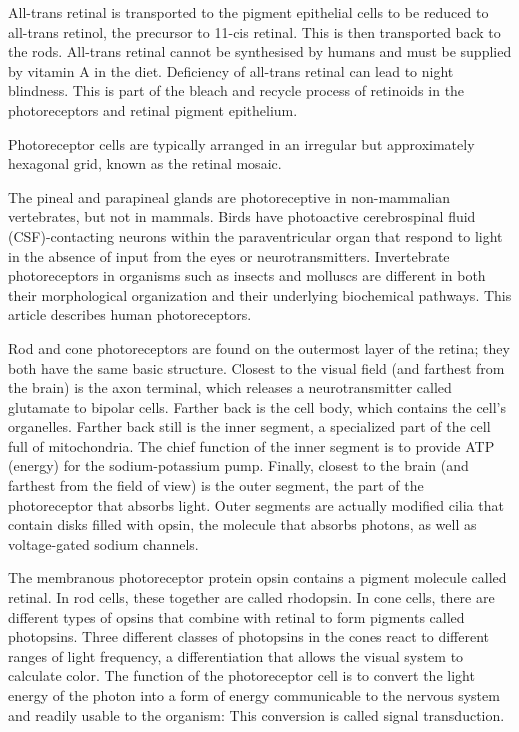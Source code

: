 All-trans retinal is transported to the pigment epithelial cells to be reduced to all-trans retinol, the precursor to 11-cis retinal. This is then transported back to the rods. All-trans retinal cannot be synthesised by humans and must be supplied by vitamin A in the diet. Deficiency of all-trans retinal can lead to night blindness. This is part of the bleach and recycle process of retinoids in the photoreceptors and retinal pigment epithelium.

Photoreceptor cells are typically arranged in an irregular but approximately hexagonal grid, known as the retinal mosaic.

The pineal and parapineal glands are photoreceptive in non-mammalian vertebrates, but not in mammals. Birds have photoactive cerebrospinal fluid (CSF)-contacting neurons within the paraventricular organ that respond to light in the absence of input from the eyes or neurotransmitters. Invertebrate photoreceptors in organisms such as insects and molluscs are different in both their morphological organization and their underlying biochemical pathways. This article describes human photoreceptors.

Rod and cone photoreceptors are found on the outermost layer of the retina; they both have the same basic structure. Closest to the visual field (and farthest from the brain) is the axon terminal, which releases a neurotransmitter called glutamate to bipolar cells. Farther back is the cell body, which contains the cell's organelles. Farther back still is the inner segment, a specialized part of the cell full of mitochondria. The chief function of the inner segment is to provide ATP (energy) for the sodium-potassium pump. Finally, closest to the brain (and farthest from the field of view) is the outer segment, the part of the photoreceptor that absorbs light. Outer segments are actually modified cilia that contain disks filled with opsin, the molecule that absorbs photons, as well as voltage-gated sodium channels.

The membranous photoreceptor protein opsin contains a pigment molecule called retinal. In rod cells, these together are called rhodopsin. In cone cells, there are different types of opsins that combine with retinal to form pigments called photopsins. Three different classes of photopsins in the cones react to different ranges of light frequency, a differentiation that allows the visual system to calculate color. The function of the photoreceptor cell is to convert the light energy of the photon into a form of energy communicable to the nervous system and readily usable to the organism: This conversion is called signal transduction.

